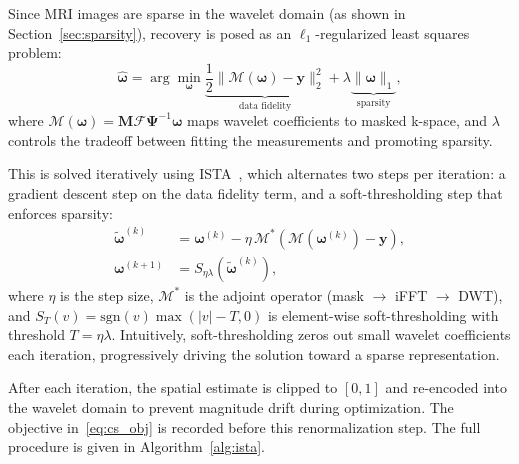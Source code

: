 \documentclass[10pt]{article}
\begin{document}
Since MRI images are sparse in the wavelet domain (as shown in Section~\ref{sec:sparsity}),
recovery is posed as an $\ell_1$-regularized least squares problem:
\begin{equation}
  \hat{\boldsymbol{\omega}} = \arg\min_{\boldsymbol{\omega}}
  \underbrace{\frac{1}{2}\|\mathcal{M}(\boldsymbol{\omega}) - \mathbf{y}\|_2^2}_{\text{data fidelity}}
  + \lambda\underbrace{\|\boldsymbol{\omega}\|_1}_{\text{sparsity}},
  \label{eq:cs_obj}
\end{equation}
where $\mathcal{M}(\boldsymbol{\omega}) = \mathbf{M}\mathcal{F}\boldsymbol{\Psi}^{-1}\boldsymbol{\omega}$
maps wavelet coefficients to masked k-space, and $\lambda$ controls the
tradeoff between fitting the measurements and promoting sparsity.

This is solved iteratively using ISTA~\cite{daubechies2004iterative}, which
alternates two steps per iteration: a gradient descent step on the data
fidelity term, and a soft-thresholding step that enforces sparsity:
\begin{align}
  \tilde{\boldsymbol{\omega}}^{(k)} &= \boldsymbol{\omega}^{(k)} - \eta\,
  \mathcal{M}^*\!\left(\mathcal{M}(\boldsymbol{\omega}^{(k)}) -
  \mathbf{y}\right), \label{eq:ista_grad}\\
  \boldsymbol{\omega}^{(k+1)} &= S_{\eta\lambda}
  \!\left(\tilde{\boldsymbol{\omega}}^{(k)}\right), \label{eq:ista_thresh}
\end{align}
where $\eta$ is the step size, $\mathcal{M}^*$ is the adjoint operator
(mask $\to$ iFFT $\to$ DWT), and $S_T(v) = \mathrm{sgn}(v)\max(|v|-T,0)$
is element-wise soft-thresholding with threshold $T = \eta\lambda$.
Intuitively, soft-thresholding zeros out small wavelet coefficients each
iteration, progressively driving the solution toward a sparse representation.

After each iteration, the spatial estimate is clipped to $[0,1]$ and
re-encoded into the wavelet domain to prevent magnitude drift during
optimization. The objective in~\eqref{eq:cs_obj} is recorded before this
renormalization step. The full procedure is given in Algorithm~\ref{alg:ista}.
\end{document}

